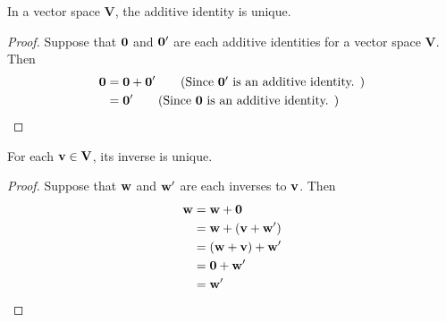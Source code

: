 \begin{lemma}
  In a vector space \( \mathbf{V} \), the additive identity is unique.
\end{lemma}
\begin{proof}
    Suppose that \( \vb{0} \) and \( \vb{0}' \) are each additive identities for a vector space \( \mathbf{V} \). Then 
    \begin{align*}
      \vb{0} &= \vb{0} + \vb{0}' \tag{Since $\vb{0}'$ is an additive identity. }\\
      &= \vb{0}' \tag{Since $\vb{0}$ is an additive identity. }
    \end{align*}
    
\end{proof}

\begin{lemma}
For each \( \vb{v} \in \mathbf{V} \), its inverse is unique.
\end{lemma}
\begin{proof}
    Suppose that \( \vb{w} \) and \( \vb{w}' \) are each inverses to \( \vb{v} \). Then 
    \begin{align*}
      \vb{w} &= \vb{w} + \vb{0}\\
      &= \vb{w} + \left( \vb{v} + \vb{w}' \right) \\
      &= \left( \vb{w} + \vb{v} \right) + \vb{w}'\\
      &= \vb{0} + \vb{w}' \\
      &= \vb{w}'
    \end{align*}
    
\end{proof}

